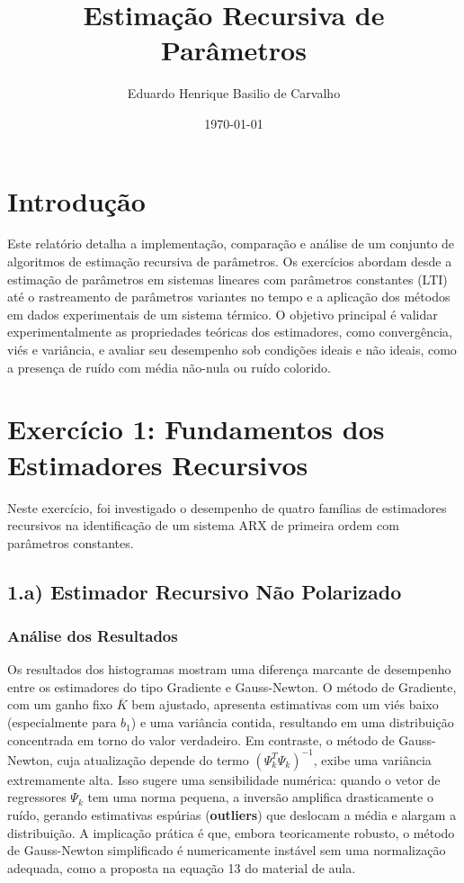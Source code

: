 \documentclass[a4paper, 11pt]{article}
\title{Estimação Recursiva de Parâmetros}
\author{Eduardo Henrique Basilio de Carvalho}
\date{\today}
\begin{document}
\maketitle

\section*{Introdução}

Este relatório detalha a implementação, comparação e análise de um conjunto de algoritmos de estimação recursiva de parâmetros. Os exercícios abordam desde a estimação de parâmetros em sistemas lineares com parâmetros constantes (LTI) até o rastreamento de parâmetros variantes no tempo e a aplicação dos métodos em dados experimentais de um sistema térmico. O objetivo principal é validar experimentalmente as propriedades teóricas dos estimadores, como convergência, viés e variância, e avaliar seu desempenho sob condições ideais e não ideais, como a presença de ruído com média não-nula ou ruído colorido.

\section*{Exercício 1: Fundamentos dos Estimadores Recursivos}
Neste exercício, foi investigado o desempenho de quatro famílias de estimadores recursivos na identificação de um sistema ARX de primeira ordem com parâmetros constantes.

\subsection*{1.a) Estimador Recursivo Não Polarizado}
\subsubsection*{Análise dos Resultados}
Os resultados dos histogramas mostram uma diferença marcante de desempenho entre os estimadores do tipo Gradiente e Gauss-Newton. O método de Gradiente, com um ganho fixo $\overline{K}$ bem ajustado, apresenta estimativas com um viés baixo (especialmente para $b_1$) e uma variância contida, resultando em uma distribuição concentrada em torno do valor verdadeiro. Em contraste, o método de Gauss-Newton, cuja atualização depende do termo $(\Psi_k^T \Psi_k)^{-1}$, exibe uma variância extremamente alta. Isso sugere uma sensibilidade numérica: quando o vetor de regressores $\Psi_k$ tem uma norma pequena, a inversão amplifica drasticamente o ruído, gerando estimativas espúrias (\textbf{outliers}) que deslocam a média e alargam a distribuição. A implicação prática é que, embora teoricamente robusto, o método de Gauss-Newton simplificado é numericamente instável sem uma normalização adequada, como a proposta na equação 13 do material de aula.
\end{document}
